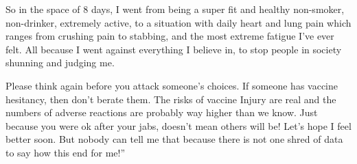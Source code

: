 So in the space of 8 days, I went from being a super fit and healthy non-smoker,
non-drinker, extremely active, to a situation with daily heart and lung pain
which ranges from crushing pain to stabbing, and the most extreme fatigue I’ve
ever felt. All because I went against everything I believe in, to stop people in
society shunning and judging me.

Please think again before you attack someone’s choices. If someone has vaccine
hesitancy, then don’t berate them. The risks of vaccine Injury are real and the
numbers of adverse reactions are probably way higher than we know. Just because
you were ok after your jabs, doesn’t mean others will be! Let’s hope I feel
better soon. But nobody can tell me that because there is not one shred of data
to say how this end for me!”
